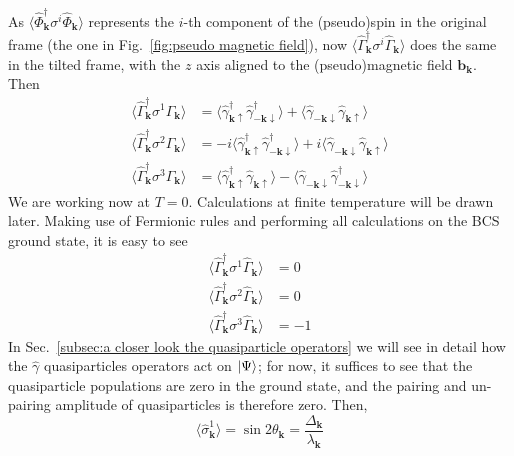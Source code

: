 As $\big\langle \hat{\Phi}_\mathbf{k}^\dagger \sigma^i \hat{\Phi}_\mathbf{k} \big\rangle$ represents the $i$-th component of the (pseudo)spin in the original frame (the one in Fig.~\ref{fig:pseudo magnetic field}), now $\big\langle \hat{\Gamma}_\mathbf{k}^\dagger \sigma^i \hat{\Gamma}_\mathbf{k} \big\rangle$ does the same in the tilted frame, with the $z$ axis aligned to the (pseudo)magnetic field $\mathbf{b}_\mathbf{k}$. Then
\[
\begin{aligned}
	\big\langle \hat{\Gamma}_\mathbf{k}^\dagger \sigma^1 \hat{\Gamma}_\mathbf{k} \big\rangle &= \big\langle \hat{\gamma}_{\mathbf{k}\uparrow}^\dagger \hat{\gamma}_{-\mathbf{k}\downarrow}^\dagger \big\rangle + \big\langle \hat{\gamma}_{-\mathbf{k}\downarrow} \hat{\gamma}_{\mathbf{k}\uparrow} \big\rangle \\
	\big\langle \hat{\Gamma}_\mathbf{k}^\dagger \sigma^2 \hat{\Gamma}_\mathbf{k} \big\rangle &= -i \big\langle \hat{\gamma}_{\mathbf{k}\uparrow}^\dagger \hat{\gamma}_{-\mathbf{k}\downarrow}^\dagger \big\rangle + i\big\langle \hat{\gamma}_{-\mathbf{k}\downarrow} \hat{\gamma}_{\mathbf{k}\uparrow} \big\rangle \\
	\big\langle \hat{\Gamma}_\mathbf{k}^\dagger \sigma^3 \hat{\Gamma}_\mathbf{k} \big\rangle &= \big\langle \hat{\gamma}_{\mathbf{k}\uparrow}^\dagger \hat{\gamma}_{\mathbf{k}\uparrow} \big\rangle - \big\langle \hat{\gamma}_{-\mathbf{k}\downarrow} \hat{\gamma}_{-\mathbf{k}\downarrow}^\dagger \big\rangle
\end{aligned}
\]
We are working now at $T=0$. Calculations at finite temperature will be drawn later. Making use of Fermionic rules and performing all calculations on the BCS ground state, it is easy to see
\[
\begin{aligned}
	\big\langle \hat{\Gamma}_\mathbf{k}^\dagger \sigma^1 \hat{\Gamma}_\mathbf{k} \big\rangle &= 0 \\
	\big\langle \hat{\Gamma}_\mathbf{k}^\dagger \sigma^2 \hat{\Gamma}_\mathbf{k} \big\rangle &= 0 \\
	\big\langle \hat{\Gamma}_\mathbf{k}^\dagger \sigma^3 \hat{\Gamma}_\mathbf{k} \big\rangle &= - 1
\end{aligned}
\]
In Sec.~\ref{subsec:a closer look the quasiparticle operators} we will see in detail how the $\hat{\gamma}$ quasiparticles operators act on $\ket{\Psi}$; for now, it suffices to see that the quasiparticle populations are zero in the ground state, and the pairing and un-pairing amplitude of quasiparticles is therefore zero. Then,
\[
	\big\langle \hat{\sigma}_\mathbf{k}^1 \big\rangle = \sin 2\theta_\mathbf{k} = \frac{\Delta_\mathbf{k}}{\lambda_\mathbf{k}}
\]
